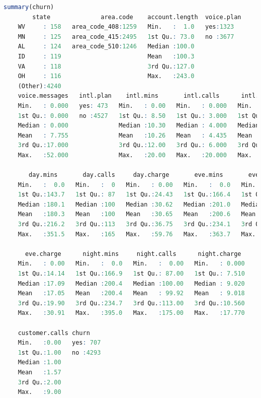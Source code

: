 \documentclass[
  11pt,
]{book}
\theoremstyle{definition}
\theoremstyle{definition}
\theoremstyle{definition}
\theoremstyle{definition}
\theoremstyle{remark}
\begin{document}
\begin{lstlisting}[language=R]
summary(churn)
        state              area.code    account.length  voice.plan
    WV     : 158   area_code_408:1259   Min.   :  1.0   yes:1323  
    MN     : 125   area_code_415:2495   1st Qu.: 73.0   no :3677  
    AL     : 124   area_code_510:1246   Median :100.0             
    ID     : 119                        Mean   :100.3             
    VA     : 118                        3rd Qu.:127.0             
    OH     : 116                        Max.   :243.0             
    (Other):4240                                                  
    voice.messages   intl.plan    intl.mins       intl.calls      intl.charge   
    Min.   : 0.000   yes: 473   Min.   : 0.00   Min.   : 0.000   Min.   :0.000  
    1st Qu.: 0.000   no :4527   1st Qu.: 8.50   1st Qu.: 3.000   1st Qu.:2.300  
    Median : 0.000              Median :10.30   Median : 4.000   Median :2.780  
    Mean   : 7.755              Mean   :10.26   Mean   : 4.435   Mean   :2.771  
    3rd Qu.:17.000              3rd Qu.:12.00   3rd Qu.: 6.000   3rd Qu.:3.240  
    Max.   :52.000              Max.   :20.00   Max.   :20.000   Max.   :5.400  
                                                                                
       day.mins       day.calls     day.charge       eve.mins       eve.calls    
    Min.   :  0.0   Min.   :  0   Min.   : 0.00   Min.   :  0.0   Min.   :  0.0  
    1st Qu.:143.7   1st Qu.: 87   1st Qu.:24.43   1st Qu.:166.4   1st Qu.: 87.0  
    Median :180.1   Median :100   Median :30.62   Median :201.0   Median :100.0  
    Mean   :180.3   Mean   :100   Mean   :30.65   Mean   :200.6   Mean   :100.2  
    3rd Qu.:216.2   3rd Qu.:113   3rd Qu.:36.75   3rd Qu.:234.1   3rd Qu.:114.0  
    Max.   :351.5   Max.   :165   Max.   :59.76   Max.   :363.7   Max.   :170.0  
                                                                                 
      eve.charge      night.mins     night.calls      night.charge   
    Min.   : 0.00   Min.   :  0.0   Min.   :  0.00   Min.   : 0.000  
    1st Qu.:14.14   1st Qu.:166.9   1st Qu.: 87.00   1st Qu.: 7.510  
    Median :17.09   Median :200.4   Median :100.00   Median : 9.020  
    Mean   :17.05   Mean   :200.4   Mean   : 99.92   Mean   : 9.018  
    3rd Qu.:19.90   3rd Qu.:234.7   3rd Qu.:113.00   3rd Qu.:10.560  
    Max.   :30.91   Max.   :395.0   Max.   :175.00   Max.   :17.770  
                                                                     
    customer.calls churn     
    Min.   :0.00   yes: 707  
    1st Qu.:1.00   no :4293  
    Median :1.00             
    Mean   :1.57             
    3rd Qu.:2.00             
    Max.   :9.00             
   
\end{lstlisting}
\end{document}
